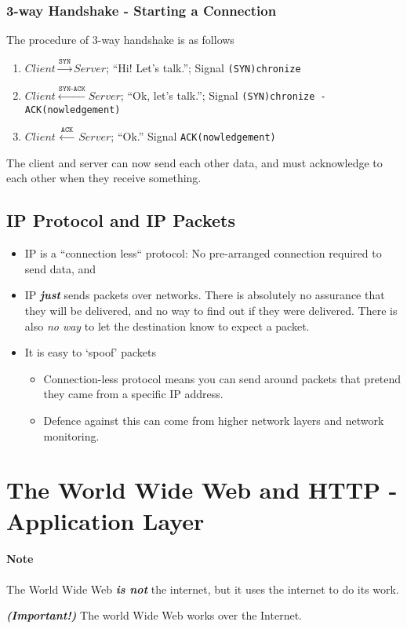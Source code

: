 \documentclass[10pt]{article}
\begin{document}
\subsubsection{3-way Handshake - Starting a Connection}
The procedure of 3-way handshake is as follows
\begin{enumerate}
    \item $Client \overset{\texttt{SYN}}{\longrightarrow} Server$; ``Hi! Let's talk.''; Signal \texttt{(SYN)chronize}
    \item $Client \overset{\texttt{SYN-ACK}}{{\longleftarrow}} Server$; ``Ok, let's talk.''; Signal \texttt{(SYN)chronize - ACK(nowledgement)}
    \item $Client ~\overset{\texttt{ACK}}{{\longleftarrow}}~ Server$; ``Ok.'' Signal \texttt{ACK(nowledgement)}
\end{enumerate}
The client and server can now send each other data, and must acknowledge to each other when they receive something. 


\subsection{IP Protocol and IP Packets}
\begin{itemize}
    \item IP is a ``connection less`` protocol: No pre-arranged connection required to send data, and
    \item IP \textbf{\textit{just}} sends packets over networks. There is absolutely no assurance that they will be delivered, and no way to find out if they were delivered. There is also \textit{no way} to let the destination know to expect a packet. 
    \item It is easy to `spoof' packets
    \begin{itemize}
        \item Connection-less protocol means you can send around packets that pretend they came from a specific IP address.
        \item Defence against this can come from higher network layers and network monitoring.
    \end{itemize}
\end{itemize}

\section{The World Wide Web and HTTP - Application Layer}
\paragraph{Note} The World Wide Web \textbf{\textit{is not}} the internet, but it uses the internet to do its work.
\begin{mdframed}
    \textbf{\textit{(Important!)}} The world Wide Web works over the Internet. 
\end{mdframed}
\end{document}
